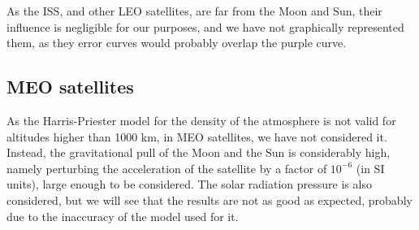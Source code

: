 \documentclass[../main.tex]{subfiles}
\begin{document}
As the ISS, and other LEO satellites, are far from the Moon and Sun, their influence is negligible for our purposes, and we have not graphically represented them, as they error curves would probably overlap the purple curve.

\subsection{MEO satellites}
As the Harris-Priester model for the density of the atmosphere is not valid for altitudes higher than 1000 km, in MEO satellites, we have not considered it. Instead, the gravitational pull of the Moon and the Sun is considerably high, namely perturbing the acceleration of the satellite by a factor of $10^{-6}$ (in SI units), large enough to be considered. The solar radiation pressure is also considered, but we will see that the results are not as good as expected, probably due to the inaccuracy of the model used for it.
\end{document}
